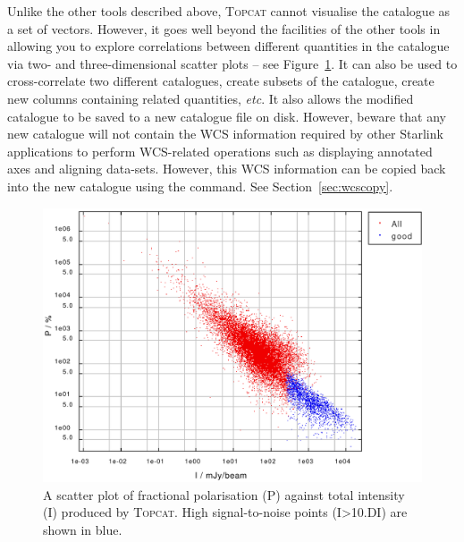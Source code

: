Unlike the other tools described above, \textsc{Topcat} cannot visualise the
catalogue as a set of vectors. However, it goes well beyond the
facilities of the other tools in allowing you to explore correlations
between different quantities in the catalogue via two- and three-dimensional
scatter plots -- see Figure~\ref{fig:topcat}. It can also be used to
cross-correlate two different
catalogues, create subsets of the catalogue, create new columns
containing related quantities, \emph{etc}. It also allows the modified
catalogue to be saved to a new catalogue file on disk. However, beware
that any new catalogue will not contain the WCS information required
by other Starlink applications to perform WCS-related operations such as
displaying annotated axes and aligning data-sets. However, this WCS
information can be copied back into the new catalogue using the
 command. See Section~\ref{sec:wcscopy}.

\begin{figure}[t!]
\begin{center}
\includegraphics[width=0.85\linewidth]{sc22-topcat}
\caption [A TOPCAT scatter plot]{A scatter plot of fractional polarisation (P)
against total intensity (I) produced by \textsc{Topcat}. High signal-to-noise points
(I>10.DI) are shown in blue.\label{fig:topcat}}
\end{center}
\end{figure}

